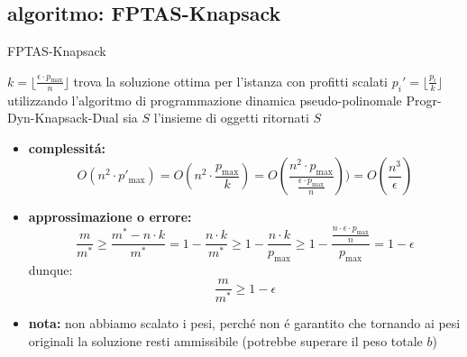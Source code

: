 
\subsection*{algoritmo: FPTAS-Knapsack}
\begin{flushleft}
	\begin{algorithm}
		\caption{FPTAS-Knapsack}
		\begin{algorithmic}
			\STATE $k=\lfloor\frac{\epsilon\cdot p_{\max}}{n}\rfloor$
			\STATE trova la soluzione ottima per l'istanza con profitti scalati
			$p_i'=\lfloor\frac{p_i}{k}\rfloor$ utilizzando l'algoritmo di programmazione dinamica
			pseudo-polinomale Progr-Dyn-Knapsack-Dual
			\STATE sia $S$ l'insieme di oggetti ritornati
			\RETURN $S$
		\end{algorithmic}
	\end{algorithm}
	\begin{itemize}
		\item \textbf{complessit\'a:}
			$$O(n^2\cdot p'_{\max})=O(n^2\cdot\frac{p_{\max}}{k})=O(\frac{n^2\cdot p_{\max}}{\frac{\epsilon\cdot p_{\max}}{n}}))=O(\frac{n^3}{\epsilon})$$
		\item \textbf{approssimazione o errore:}
			$$\frac{m}{m^*}\geq\frac{m^*-n\cdot k}{m^*}=1-\frac{n\cdot k}{m^*}\geq 1-\frac{n\cdot k}{p_{\max}}\geq 1-\frac{\frac{n\cdot\epsilon\cdot p_{\max}}{n}}{p_{\max}}=1-\epsilon$$
		dunque:
			$$\frac{m}{m^*}\geq 1-\epsilon$$
		\item \textbf{nota:} non abbiamo scalato i pesi, perch\'e non \'e garantito che tornando ai
			pesi originali la soluzione resti ammissibile (potrebbe superare il peso totale $b$)
	\end{itemize}
\end{flushleft}


